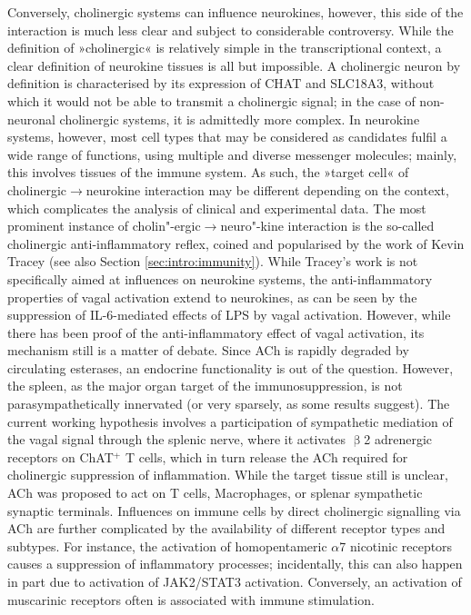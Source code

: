 Conversely, cholinergic systems can influence neurokines, however, this side of the interaction is much less clear and subject to considerable controversy. While the definition of »cholinergic« is relatively simple in the transcriptional context, a clear definition of neurokine tissues is all but impossible. A cholinergic neuron by definition is characterised by its expression of CHAT and SLC18A3, without which it would not be able to transmit a cholinergic signal; in the case of non-neuronal cholinergic systems, it is admittedly more complex. In neurokine systems, however, most cell types that may be considered as candidates fulfil a wide range of functions, using multiple and diverse messenger molecules; mainly, this involves tissues of the immune system. As such, the »target cell« of cholinergic$\to$neurokine interaction may be different depending on the context, which complicates the analysis of clinical and experimental data. The most prominent instance of cholin"-ergic$\to$neuro"-kine interaction is the so-called cholinergic anti-inflammatory reflex, coined and popularised by the work of Kevin Tracey (see also Section \ref{sec:intro:immunity}).\cite{Tracey2002} While Tracey's work is not specifically aimed at influences on neurokine systems, the anti-inflammatory properties of vagal activation extend to neurokines, as can be seen by the suppression of IL-6-mediated effects of LPS by vagal activation.\cite{Garcia-Oscos2015} However, while there has been proof of the anti-inflammatory effect of vagal activation, its mechanism still is a matter of debate. Since ACh is rapidly degraded by circulating esterases, an endocrine functionality is out of the question. However, the spleen, as the major organ target of the immunosuppression, is not parasympathetically innervated (or very sparsely, as some results suggest).\cite{Fujii2017} The current working hypothesis involves a participation of sympathetic mediation of the vagal signal through the splenic nerve, where it activates $\upbeta$2 adrenergic receptors on ChAT$^+$ T cells, which in turn release the ACh required for cholinergic suppression of inflammation. While the target tissue still is unclear, ACh was proposed to act on T cells, Macrophages, or splenar sympathetic synaptic terminals.\cite{Zila2017} Influences on immune cells by direct cholinergic signalling via ACh are further complicated by the availability of different receptor types and subtypes. For instance, the activation of homopentameric $\alpha$7 nicotinic receptors causes a suppression of inflammatory processes; incidentally, this can also happen in part due to activation of JAK2/STAT3 activation.\cite{Cui2010} Conversely, an activation of muscarinic receptors often is associated with immune stimulation.\cite{Razani-Boroujerdi2008}

